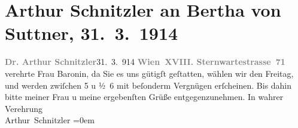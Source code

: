

               \section[Arthur Schnitzler an Bertha von Suttner, 31. 3. 1914]{ Arthur Schnitzler an Bertha von Suttner,
                    31. 3. 1914}\nopagebreak{}\rehead{ }\begin{ledgroupsized}[t]{13cm}\normalsize\beginnumbering{} \toendnotes[C]{\smallbreak\pagebreak[2]} 
\toendnotes[C]{\smallbreak}\pstart
           \noindent{}{\pb}\textcolor{gray}{\textbf{Dr. Arthur Schnitzler}}\hfill 31. 3. 914\pend
           \pstart
           \textcolor{gray}{\textbf{Wien XVIII. Sternwartestrasse 71}}\pend
           \pstart
           verehrte Frau Baronin, da Sie es uns gütigſt geſtatten, wählen
                    wir den Freitag, und werden zwiſchen 5 u ½ 6 mit
                    beſonderm Vergnügen erſcheinen. Bis dahin bitte meiner {\pb}Frau u meine ergebenſten
                    Grüße entgegenzunehmen.\pend
           \pstart
           In wahrer Verehrung{\\[\baselineskip]}\spacefill\mbox{Arthur Schnitzler}\pend
           \leftskip=0em{}\endnumbering{}\end{ledgroupsized}  \newcommand{\dateiname}{L02171}\newcommand{\titel}{Arthur Schnitzler an Bertha von Suttner, 31. 3. 1914}\newcommand{\editorInnen}{Martin Anton Müller und Gerd-Hermann Susen}
      